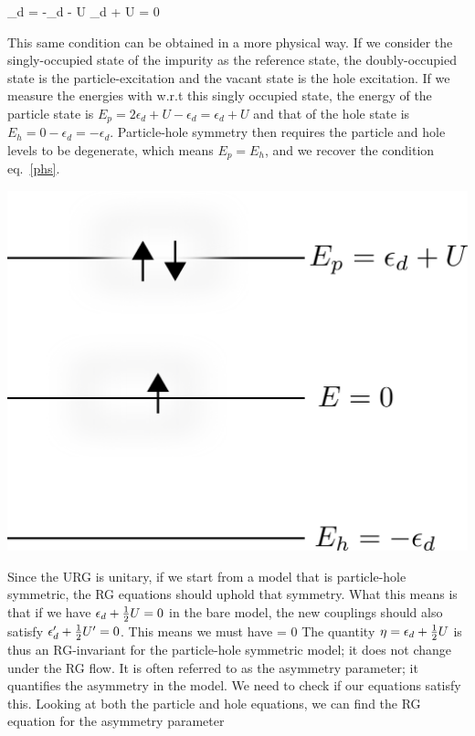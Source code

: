\documentclass[14pt]{extarticle}
\numberwithin{equation}{section}
\begin{document}
\beq[phs]
\epsilon_d = -\epsilon_d - U \implies \epsilon_d + \hf U = 0
\eeq
\begin{minipage}{260pt}
	This same condition can be obtained in a more physical way. If we consider the singly-occupied state of the impurity as the reference state, the doubly-occupied state is the particle-excitation and the vacant state is the hole excitation. If we measure the energies with w.r.t this singly occupied state, the energy of the particle state is \(E_p = 2\epsilon_d + U - \epsilon_d = \epsilon_d + U\) and that of the hole state is \(E_h = 0 - \epsilon_d = - \epsilon_d\). Particle-hole symmetry then requires the particle and hole levels to be degenerate, which means \(E_p = E_h\), and we recover the condition eq.~\ref{phs}.
\end{minipage}
\hspace*{15pt}\begin{minipage}{250pt}
	\centering\includegraphics[scale=0.35]{phsymm.png}
\end{minipage}
\pb Since the URG is unitary, if we start from a model that is particle-hole symmetric, the RG equations should uphold that symmetry. What this means is that if we have \(\epsilon_d + \frac{1}{2} U = 0\) in the bare model, the new couplings should also satisfy \(\epsilon_d^\prime + \frac{1}{2} U^\prime = 0\). This means we must have 
\beq
\Delta{} = 0
\eeq
The quantity \(\eta = \epsilon_d + \frac{1}{2} U\) is thus an RG-invariant for the particle-hole symmetric model; it does not change under the RG flow. It is often referred to as the asymmetry parameter; it quantifies the asymmetry in the model. We need to check if our equations satisfy this. Looking at both the particle and hole equations, we can find the RG equation for the asymmetry parameter
\end{document}

